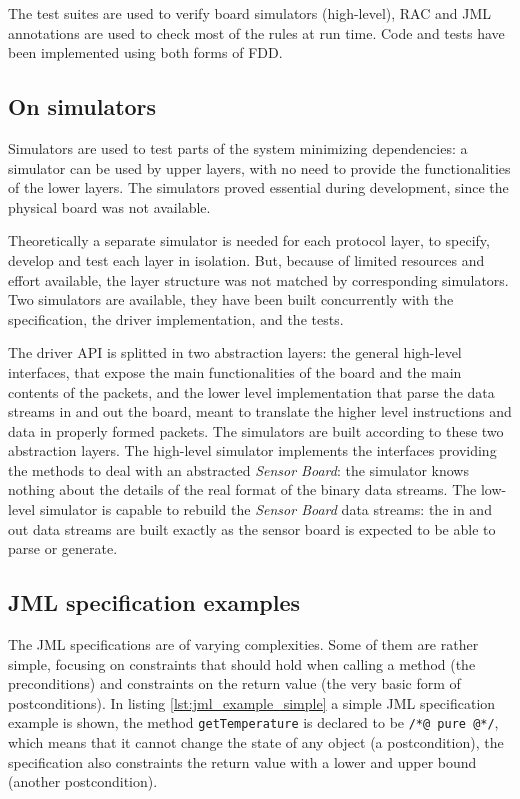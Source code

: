 \documentclass[english]{lni}
\newcommand{\lil}[1]{\texttt{\lstinline|#1|}}
\newcommand{\SB}{\emph{Sensor Board}\xspace}
\begin{document}
The test suites are used to verify board simulators (high-level), RAC and JML annotations are used to check most of the rules at run time.
Code and tests have been implemented using both forms of FDD.



\subsection{On simulators}
\label{subsec:on_simulators}

Simulators are used to test parts of the system minimizing dependencies: a simulator can be used by upper layers, with no need to provide the functionalities of the lower layers. 
The simulators proved essential during development, since the physical board was not available.

Theoretically a separate simulator is needed for each protocol layer, to specify, develop and test each layer in isolation.  
But, because of limited resources and effort available, the layer structure was not matched by corresponding simulators.
Two simulators are available, they have been built concurrently with the specification, the driver implementation, and the tests.

The driver API is splitted in two abstraction layers: the general high-level interfaces, that expose the main functionalities of the board and the main contents of the packets, and the lower level implementation that parse the data streams in and out the board, meant to translate the higher level instructions and data in properly formed packets.
The simulators are built according to these two abstraction layers.
The high-level simulator implements the interfaces providing the methods to deal with an abstracted \SB: the simulator knows nothing
about the details of the real format of the binary data streams.
The low-level simulator is capable to rebuild the \SB data streams: the in and out data streams are built exactly as the sensor board is expected to be able to parse or generate.



\subsection{JML specification examples}
\label{subsec:a_jml_specification_example}

The JML specifications are of varying complexities.  
Some of them are rather simple, focusing on constraints that should hold when calling a method (the preconditions) and constraints on the return value (the very basic form of postconditions). 
In listing \ref{lst:jml_example_simple} a simple JML specification example is shown, the method \lil{getTemperature} is declared to be \lil{/*@ pure @*/}, which means that it cannot change the state of any object (a postcondition), the specification also constraints the return value with a lower and upper bound (another postcondition).
\end{document}
